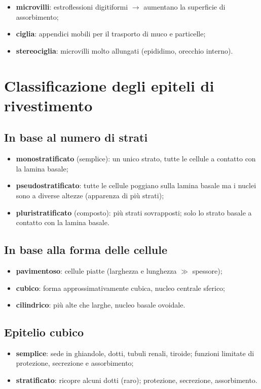 \begin{itemize}
  \item \textbf{microvilli}: estroflessioni digitiformi $\rightarrow$ aumentano la superficie di
    assorbimento;
  \item \textbf{ciglia}: appendici mobili per il trasporto di muco e particelle;
  \item \textbf{stereociglia}: microvilli molto allungati (epididimo, orecchio interno).
\end{itemize}

\section{Classificazione degli epiteli di rivestimento}

\subsection{In base al numero di strati}
\begin{itemize}
  \item \textbf{monostratificato} (semplice): un unico strato, tutte le cellule a contatto con la
    lamina basale;
  \item \textbf{pseudostratificato}: tutte le cellule poggiano sulla lamina basale ma i nuclei
    sono a diverse altezze (apparenza di più strati);
  \item \textbf{pluristratificato} (composto): più strati sovrapposti; solo lo strato basale a
    contatto con la lamina basale.
\end{itemize}

\subsection{In base alla forma delle cellule}
\begin{itemize}
  \item \textbf{pavimentoso}: cellule piatte (larghezza e lunghezza $\gg$ spessore);
  \item \textbf{cubico}: forma approssimativamente cubica, nucleo centrale sferico;
  \item \textbf{cilindrico}: più alte che larghe, nucleo basale ovoidale.
\end{itemize}

\subsection{Epitelio cubico}
\begin{itemize}
  \item \textbf{semplice}: sede in ghiandole, dotti, tubuli renali, tiroide; funzioni limitate di
    protezione, secrezione e assorbimento;
  \item \textbf{stratificato}: ricopre alcuni dotti (raro); protezione, secrezione, assorbimento.
\end{itemize}

